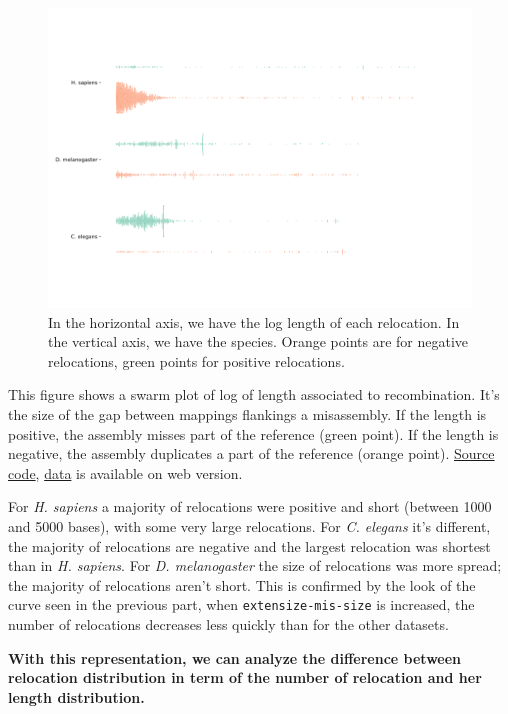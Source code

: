 \documentclass[./main.tex]{subfiles}
\begin{document}
\begin{figure}[ht]
\centering
\includegraphics[width=\textwidth]{paper/misassemblies-in-noisy-assemblies/relocation_length.pdf}
\caption{In the horizontal axis, we have the log length of each relocation. In
the vertical axis, we have the species. Orange points are for negative
relocations, green points for positive relocations.}
\end{figure}

This figure shows a swarm plot of log of length associated to
recombination. It's the size of the gap between mappings flankings a
misassembly. If the length is positive, the assembly misses part of the
reference (green point). If the length is negative, the assembly
duplicates a part of the reference (orange point).
\href{relocation_length.py}{Source code},
\href{relocation_length.csv}{data} is available on web version.

For \emph{H. sapiens} a majority of relocations were positive and short
(between 1000 and 5000 bases), with some very large relocations. For
\emph{C. elegans} it's different, the majority of relocations are
negative and the largest relocation was shortest than in \emph{H.
sapiens}. For \emph{D. melanogaster} the size of relocations was more
spread; the majority of relocations aren't short. This is confirmed by
the look of the curve seen in the previous part, when
\texttt{extensize-mis-size} is increased, the number of relocations
decreases less quickly than for the other datasets.

\textbf{With this representation, we can analyze the difference between
relocation distribution in term of the number of relocation and her
length distribution.}
\end{document}
